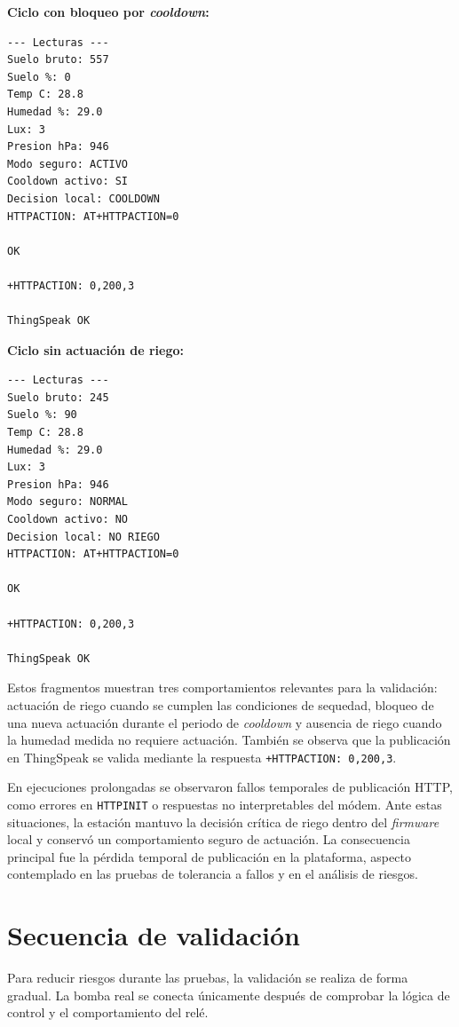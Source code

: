 \textbf{Ciclo con bloqueo por \textit{cooldown}:}

\begin{verbatim}
--- Lecturas ---
Suelo bruto: 557
Suelo %: 0
Temp C: 28.8
Humedad %: 29.0
Lux: 3
Presion hPa: 946
Modo seguro: ACTIVO
Cooldown activo: SI
Decision local: COOLDOWN
HTTPACTION: AT+HTTPACTION=0

OK

+HTTPACTION: 0,200,3

ThingSpeak OK
\end{verbatim}

\textbf{Ciclo sin actuación de riego:}

\begin{verbatim}
--- Lecturas ---
Suelo bruto: 245
Suelo %: 90
Temp C: 28.8
Humedad %: 29.0
Lux: 3
Presion hPa: 946
Modo seguro: NORMAL
Cooldown activo: NO
Decision local: NO RIEGO
HTTPACTION: AT+HTTPACTION=0

OK

+HTTPACTION: 0,200,3

ThingSpeak OK
\end{verbatim}

Estos fragmentos muestran tres comportamientos relevantes para la validación: actuación de riego cuando se cumplen las condiciones de sequedad, bloqueo de una nueva actuación durante el periodo de \textit{cooldown} y ausencia de riego cuando la humedad medida no requiere actuación. También se observa que la publicación en ThingSpeak se valida mediante la respuesta \texttt{+HTTPACTION: 0,200,3}.

En ejecuciones prolongadas se observaron fallos temporales de publicación HTTP, como errores en \texttt{HTTPINIT} o respuestas no interpretables del módem. Ante estas situaciones, la estación mantuvo la decisión crítica de riego dentro del \textit{firmware} local y conservó un comportamiento seguro de actuación. La consecuencia principal fue la pérdida temporal de publicación en la plataforma, aspecto contemplado en las pruebas de tolerancia a fallos y en el análisis de riesgos.

\section{Secuencia de validación}

Para reducir riesgos durante las pruebas, la validación se realiza de forma gradual. La bomba real se conecta únicamente después de comprobar la lógica de control y el comportamiento del relé.


